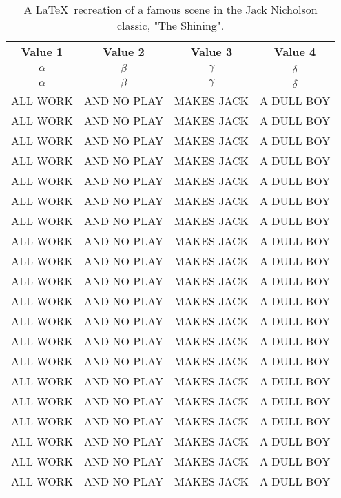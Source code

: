 \documentclass{article}
\begin{document}
	\begin{longtable}[c]{cccc}
		\caption{A \LaTeX \, recreation of a famous scene in the Jack Nicholson classic, "The Shining".}
		\label{tab:Johnny}\\
		\toprule
		\textbf{Value 1} & \textbf{Value 2} & \textbf{Value 3} & \textbf{Value 4} \\
		$\alpha$ & $\beta$ & $\gamma$ & $\delta$ \\
		\midrule
		\endfirsthead %
		$\alpha$ & $\beta$ & $\gamma$ & $\delta$ \\
		\midrule
		\endhead %
		ALL WORK & AND NO PLAY & MAKES JACK & A DULL BOY \\
		ALL WORK & AND NO PLAY & MAKES JACK & A DULL BOY \\
		ALL WORK & AND NO PLAY & MAKES JACK & A DULL BOY \\
		ALL WORK & AND NO PLAY & MAKES JACK & A DULL BOY \\
		ALL WORK & AND NO PLAY & MAKES JACK & A DULL BOY \\
		ALL WORK & AND NO PLAY & MAKES JACK & A DULL BOY \\
		ALL WORK & AND NO PLAY & MAKES JACK & A DULL BOY \\
		ALL WORK & AND NO PLAY & MAKES JACK & A DULL BOY \\
		ALL WORK & AND NO PLAY & MAKES JACK & A DULL BOY \\
		ALL WORK & AND NO PLAY & MAKES JACK & A DULL BOY \\
		ALL WORK & AND NO PLAY & MAKES JACK & A DULL BOY \\
		ALL WORK & AND NO PLAY & MAKES JACK & A DULL BOY \\
		ALL WORK & AND NO PLAY & MAKES JACK & A DULL BOY \\
		ALL WORK & AND NO PLAY & MAKES JACK & A DULL BOY \\
		ALL WORK & AND NO PLAY & MAKES JACK & A DULL BOY \\
		ALL WORK & AND NO PLAY & MAKES JACK & A DULL BOY \\
		ALL WORK & AND NO PLAY & MAKES JACK & A DULL BOY \\
		ALL WORK & AND NO PLAY & MAKES JACK & A DULL BOY \\
		ALL WORK & AND NO PLAY & MAKES JACK & A DULL BOY \\
		ALL WORK & AND NO PLAY & MAKES JACK & A DULL BOY \\

\end{longtable}
\end{document}

